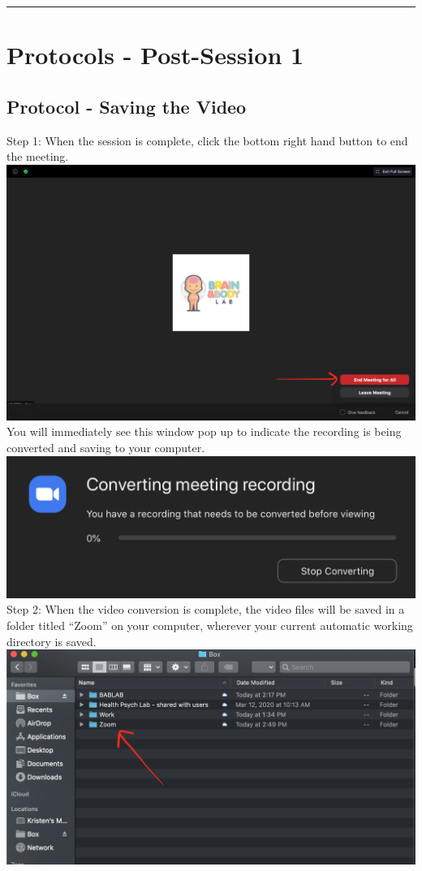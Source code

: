 \documentclass[]{book}
\begin{document}
\begin{center}\rule{0.5\linewidth}{0.5pt}\end{center}

\hypertarget{protocols---post-session-1}{%
\section{Protocols - Post-Session 1}\label{protocols---post-session-1}}

\hypertarget{protocol---saving-the-video}{%
\subsection{Protocol - Saving the Video}\label{protocol---saving-the-video}}

Step 1:
When the session is complete, click the bottom right hand button to end the meeting. \includegraphics{images/zoom_parent_child_interaction/7.png} You will immediately see this window pop up to indicate the recording is being converted and saving to your computer. \includegraphics{images/zoom_parent_child_interaction/8.png}
Step 2:
When the video conversion is complete, the video files will be saved in a folder titled ``Zoom'' on your computer, wherever your current automatic working directory is saved. \includegraphics{images/zoom_parent_child_interaction/9.png}
\end{document}

